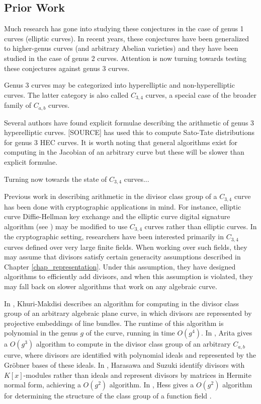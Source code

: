 
\subsection{Prior Work}

Much research has gone into studying these conjectures in the case of genus 1 curves (elliptic curves).
In recent years, these conjectures have been generalized to higher-genus curves (and arbitrary Abelian varieties)
and they have been studied in the case of genus 2 curves.
Attention is now turning towards testing these conjectures against genus 3 curves.

Genus 3 curves may be categorized into hyperelliptic and non-hyperelliptic curves.
The latter category is also called $C_{3,4}$ curves, a special case of the broader family of $C_{a,b}$ curves.

Several authors have found explicit formulae describing the arithmetic of genus 3 hyperelliptic curves.
[SOURCE] has used this to compute Sato-Tate distributions for genus 3 HEC curves.
It is worth noting that general algorithms exist for computing in the Jacobian of an arbitrary curve
but these will be slower than explicit formulae.

Turning now towards the state of $C_{3,4}$ curves...

Previous work in describing arithmetic in the divisor class group of a $C_{3,4}$ curve has been done with cryptographic applications in mind.
For instance, elliptic curve Diffie-Hellman key exchange and the elliptic curve digital signature algorithm (see )
may be modified to use $C_{3,4}$ curves rather than elliptic curves.
In the cryptographic setting, researchers have been interested primarily in $C_{3,4}$ curves defined over very large finite fields.
When working over such fields, they may assume that divisors satisfy certain generacity assumptions described in Chapter \ref{chap_representation}.
Under this assumption, they have designed algorithms to efficiently add divisors,
and when this assumption is violated, they may fall back on slower algorithms that work on any algebraic curve.

In \cite{makdisi04}, Khuri-Makdisi describes an algorithm for computing in the divisor class group of an arbitrary algebraic plane curve,
in which divisors are represented by projective embeddings of line bundles.
The runtime of this algorithm is polynomial in the genus $g$ of the curve, running in time $O(g^4)$.
In \cite{arita99}, Arita gives a $O(g^3)$ algorithm to compute in the divisor class group of an arbitrary $C_{a,b}$ curve,
where divisors are identified with polynomial ideals and represented by the Gr\"obner bases of these ideals.
In \cite{harasawa00}, Harasawa and Suzuki identify divisors with $K[x]$-modules rather than ideals and represent divisors by matrices in Hermite normal form,
achieving a $O(g^2)$ algorithm.
In \cite{hess99}, Hess gives a $O(g^2)$ algorithm for determining the structure of the class group of a function field 
.

